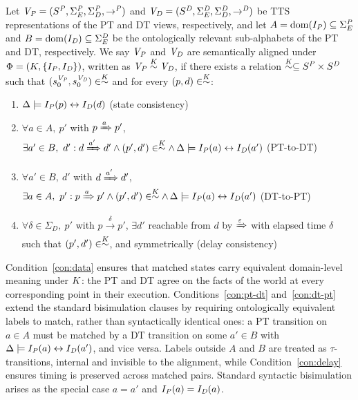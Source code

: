 \begin{definition}
\label{def:semantic_alignment}
Let $\mathit{V_P} = (S^{\mathit{P}}, \Sigma_E^{\mathit{P}}, \Sigma_D^{\mathit{P}}, 
\rightarrow^{\mathit{P}})$ and $\mathit{V_D} = (S^{\mathit{D}}, \Sigma_E^{\mathit{D}}, 
\Sigma_D^{\mathit{D}}, \rightarrow^{\mathit{D}})$ be TTS representations of the 
PT and DT views, respectively, and let $A = \mathrm{dom}(I_{\mathit{P}}) 
\subseteq \Sigma_E^{\mathit{P}}$ and $B = \mathrm{dom}(I_{\mathit{D}}) 
\subseteq \Sigma_E^{\mathit{D}}$ be the ontologically relevant 
sub-alphabets of the PT and DT, respectively. We say $\mathit{V_P}$ 
and $\mathit{V_D}$ are semantically aligned under $\Phi = 
(K, \{I_{\mathit{P}}, I_{\mathit{D}}\})$, written as $\mathit{V_P} \stackrel{K}{\sim} \mathit{V_D}$, 
if there exists a relation $\stackrel{K}{\sim} \subseteq S^{\mathit{P}} \times 
S^{\mathit{D}}$ such that $(s^{\mathit{V_P}}_0, s^{\mathit{V_D}}_0) \in \stackrel{K}{\sim}$ 
and for every $(p, d) \in \stackrel{K}{\sim}$:
\begin{enumerate}[label=\Roman*), ref=\Roman*]
\item \label{con:data} $\Delta \models I_{\mathit{P}}(p) 
\leftrightarrow I_{\mathit{D}}(d)$ \hfill (state consistency)
\item \label{con:pt-dt} $\forall a \in A,\ p'$ 
with $p \xRightarrow{a} p'$, $\exists a' \in B,\ 
d' : d \xRightarrow{a'} d' \wedge (p', d') \in \relation \wedge \,
\Delta \models \IPT(a) \leftrightarrow 
\IDT(a')$ \hfill (PT-to-DT)
\item \label{con:dt-pt} $\forall a' \in B,\ d'$ 
with $d \xRightarrow{a'} d'$, $\exists a \in A,\ 
p' : p \xRightarrow{a} p' \wedge (p', d') \in \relation \wedge \,
\Delta \models \IPT(a) \leftrightarrow 
\IDT(a')$ \hfill (DT-to-PT)
\item \label{con:delay} $\forall \delta \in \Sigma_D,\ p'$ with 
$p \xrightarrow{\delta} p'$, $\exists d'$ reachable from $d$ by 
$\xRightarrow{\varepsilon}$ with elapsed time $\delta$ such that 
$(p', d') \in \stackrel{K}{\sim}$, and symmetrically \hfill (delay consistency)
\end{enumerate}
\end{definition}

Condition~\ref{con:data} ensures that matched states carry
equivalent domain-level meaning under $K$: the PT and DT
agree on the facts of the world at every corresponding point in
their execution. Conditions~\ref{con:pt-dt} and~\ref{con:dt-pt}
extend the standard bisimulation clauses by requiring ontologically
equivalent labels to match, rather than syntactically identical
ones: a PT transition on $a \in A$ must be matched by a DT
transition on some $a' \in B$ with $\Delta \models I_{\mathit{P}}(a)
\leftrightarrow I_{\mathit{D}}(a')$, and vice versa. Labels outside $A$ and
$B$ are treated as $\tau$-transitions, internal and invisible to
the alignment, while Condition~\ref{con:delay} ensures timing is
preserved across matched pairs. Standard syntactic bisimulation
arises as the special case $a = a'$ and $I_{\mathit{P}}(a) = I_{\mathit{D}}(a)$.

